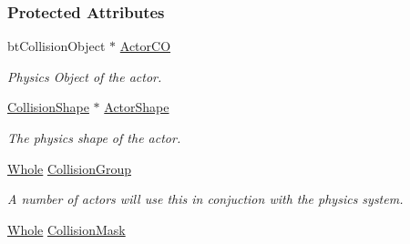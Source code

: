 \subsubsection*{Protected Attributes}
\begin{DoxyCompactItemize}
\item 
\hypertarget{classMezzanine_1_1ActorBasePhysicsSettings_a47a08b77d0725be25ab2adfa50a0939e}{
btCollisionObject $\ast$ \hyperlink{classMezzanine_1_1ActorBasePhysicsSettings_a47a08b77d0725be25ab2adfa50a0939e}{ActorCO}}
\label{classMezzanine_1_1ActorBasePhysicsSettings_a47a08b77d0725be25ab2adfa50a0939e}

\begin{DoxyCompactList}\small\item\em Physics Object of the actor. \item\end{DoxyCompactList}\item 
\hypertarget{classMezzanine_1_1ActorBasePhysicsSettings_a00429bec7040c9cf83d334ed585c95ae}{
\hyperlink{classMezzanine_1_1CollisionShape}{CollisionShape} $\ast$ \hyperlink{classMezzanine_1_1ActorBasePhysicsSettings_a00429bec7040c9cf83d334ed585c95ae}{ActorShape}}
\label{classMezzanine_1_1ActorBasePhysicsSettings_a00429bec7040c9cf83d334ed585c95ae}

\begin{DoxyCompactList}\small\item\em The physics shape of the actor. \item\end{DoxyCompactList}\item 
\hypertarget{classMezzanine_1_1ActorBasePhysicsSettings_ab4535762610bac78d33101124b4bc213}{
\hyperlink{namespaceMezzanine_adcbb6ce6d1eb4379d109e51171e2e493}{Whole} \hyperlink{classMezzanine_1_1ActorBasePhysicsSettings_ab4535762610bac78d33101124b4bc213}{CollisionGroup}}
\label{classMezzanine_1_1ActorBasePhysicsSettings_ab4535762610bac78d33101124b4bc213}

\begin{DoxyCompactList}\small\item\em A number of actors will use this in conjuction with the physics system. \item\end{DoxyCompactList}\item 
\hypertarget{classMezzanine_1_1ActorBasePhysicsSettings_a72bf0fb7bd68f354647de5160a115809}{
\hyperlink{namespaceMezzanine_adcbb6ce6d1eb4379d109e51171e2e493}{Whole} \hyperlink{classMezzanine_1_1ActorBasePhysicsSettings_a72bf0fb7bd68f354647de5160a115809}{CollisionMask}}
\label{classMezzanine_1_1ActorBasePhysicsSettings_a72bf0fb7bd68f354647de5160a115809}


\end{DoxyCompactItemize}

